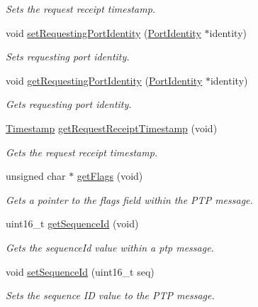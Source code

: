 \begin{DoxyCompactItemize}
\begin{DoxyCompactList}\small\item\em Sets the request receipt timestamp. \end{DoxyCompactList}\item 
void \hyperlink{class_p_t_p_message_path_delay_resp_a8a5973763e2ea58d2aaf9cfc8ca8456b}{set\+Requesting\+Port\+Identity} (\hyperlink{class_port_identity}{Port\+Identity} $\ast$identity)
\begin{DoxyCompactList}\small\item\em Sets requesting port identity. \end{DoxyCompactList}\item 
void \hyperlink{class_p_t_p_message_path_delay_resp_ada6cc047961dccdd3c4b2000b8da27b3}{get\+Requesting\+Port\+Identity} (\hyperlink{class_port_identity}{Port\+Identity} $\ast$identity)
\begin{DoxyCompactList}\small\item\em Gets requesting port identity. \end{DoxyCompactList}\item 
\hyperlink{class_timestamp}{Timestamp} \hyperlink{class_p_t_p_message_path_delay_resp_a12ed80e37072923c206440c8ef3cc36c}{get\+Request\+Receipt\+Timestamp} (void)
\begin{DoxyCompactList}\small\item\em Gets the request receipt timestamp. \end{DoxyCompactList}\item 
unsigned char $\ast$ \hyperlink{class_p_t_p_message_common_aa75ce7cb63073d090a15ca2c28b6819a}{get\+Flags} (void)
\begin{DoxyCompactList}\small\item\em Gets a pointer to the flags field within the P\+TP message. \end{DoxyCompactList}\item 
uint16\+\_\+t \hyperlink{class_p_t_p_message_common_abd5cac5701120cbbfc56129b31fa801f}{get\+Sequence\+Id} (void)
\begin{DoxyCompactList}\small\item\em Gets the sequence\+Id value within a ptp message. \end{DoxyCompactList}\item 
void \hyperlink{class_p_t_p_message_common_a7fc215800bddc8a39e50e463ffbe651a}{set\+Sequence\+Id} (uint16\+\_\+t seq)
\begin{DoxyCompactList}\small\item\em Sets the sequence ID value to the P\+TP message. \end{DoxyCompactList}\item 

\end{DoxyCompactItemize}
